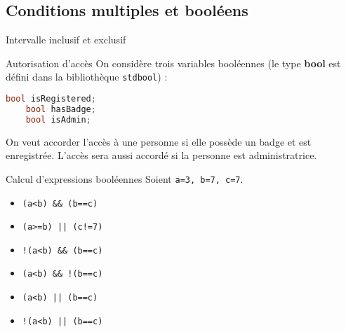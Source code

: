 \subsection{Conditions multiples et booléens}

\begin{UPSTIexercice}{Intervalle inclusif et exclusif}
\end{UPSTIexercice}


\begin{UPSTIexercice}{Autorisation d'accès}
On considère trois variables booléennes (le type \textbf{bool} est défini dans la bibliothèque \texttt{stdbool}) :
\begin{lstlisting}[language=c]
    bool isRegistered;
    bool hasBadge; 
    bool isAdmin;
\end{lstlisting}

On veut accorder l'accès à une personne si elle possède un badge et est enregistrée. L'accès sera aussi accordé si la personne est administratrice.
\end{UPSTIexercice}


\begin{UPSTIexercice}{Calcul d'expressions booléennes}
Soient \verb|a=3, b=7, c=7|.
\begin{multicols}{3}
\begin{itemize}
    \item \verb|(a<b) && (b==c)|
    \item \verb$(a>=b) || (c!=7)$
    \item \verb|!(a<b) && (b==c)|
    \item \verb|(a<b) && !(b==c)|
    \item \verb$(a<b) || (b==c)$
    \item \verb$!(a<b) || (b==c)$
\end{itemize}
\end{multicols}
\end{UPSTIexercice}


